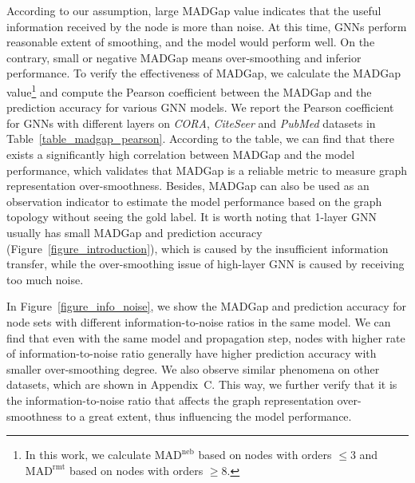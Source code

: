 \documentclass[letterpaper]{article} \usepackage{aaai20}  \usepackage{times}  \usepackage{helvet} \usepackage{courier}  \usepackage[hyphens]{url}  \usepackage{graphicx} \urlstyle{rm} \def\UrlFont{\rm}  \frenchspacing  \setlength{\pdfpagewidth}{8.5in}  \setlength{\pdfpageheight}{11in}  \setcounter{secnumdepth}{0}
\begin{document}
According to our assumption, large MADGap value indicates that the useful information received by the node is more than noise. At this time, GNNs perform reasonable extent of smoothing, and the model would perform well. On the contrary, small or negative MADGap means over-smoothing and inferior performance. 
To verify the effectiveness of MADGap, we calculate the MADGap value\footnote{In this work, we calculate $\mathrm{MAD^{neb}}$ based on nodes with orders $\le3$ and $\mathrm{MAD^{rmt}}$ based on nodes with orders $\ge8$.} and compute the Pearson coefficient between the MADGap and the prediction accuracy for various GNN models. 
We report the Pearson coefficient for GNNs with different layers on \textit{CORA}, \textit{CiteSeer} and \textit{PubMed} datasets in Table~\ref{table_madgap_pearson}.
According to the table, we can find that there exists a significantly high correlation between MADGap and the model performance, which validates that MADGap is a reliable metric to measure graph representation over-smoothness. Besides, MADGap can also be used as an observation indicator to estimate the model performance based on the graph topology without seeing the gold label.
It is worth noting that 1-layer GNN usually has small MADGap and prediction accuracy (Figure~\ref{figure_introduction}), which is caused by the insufficient information transfer, while the over-smoothing issue of high-layer GNN is caused by receiving too much noise.
 
In Figure~\ref{figure_info_noise}, we show the MADGap and prediction accuracy for node sets with different information-to-noise ratios in the same model. We can find that even with the same model and propagation step, nodes with higher rate of information-to-noise ratio generally have higher prediction accuracy with smaller over-smoothing degree. We also observe similar phenomena on other datasets, which are shown in Appendix~C. This way, we further verify that it is the information-to-noise ratio that affects the graph representation over-smoothness to a great extent, thus influencing the model performance.
\end{document}
